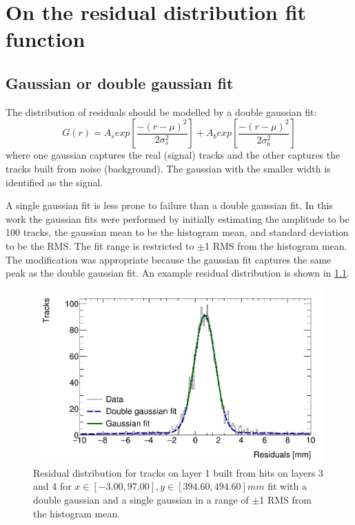 \chapter[Residual distribution fit function]{On the residual distribution fit function}
\label{appendix-double_gaussian}

\section{Gaussian or double gaussian fit}

The distribution of residuals should be modelled by a double gaussian fit:
$$ G(r) = A_{s}exp\left[ \frac{-(r-\mu)^{2}}{2\sigma_s^{2}} \right] + A_{b}exp\left[ \frac{-(r-\mu)^{2}}{2\sigma_b^{2}} \right]$$
where one gaussian captures the real (signal) tracks and the other captures the tracks built from noise (background). The gaussian with the smaller width is identified as the signal. 

A single gaussian fit is less prone to failure than a double gaussian fit. In this work the gaussian fits were performed by initially estimating the amplitude to be 100 tracks, the gaussian mean to be the histogram mean, and standard deviation to be the RMS. The fit range is restricted to $\pm$1 RMS from the histogram mean. The modification was appropriate because the gaussian fit captures the same peak as the double gaussian fit. An example residual distribution is shown in \ref{fig:double_gaussian_example_fit}. 

\begin{figure}
    \centering
    \includegraphics[width = \textwidth]{figures/figure_double_gaussian_quick_and_dirty_2900V_log_scale_gaussian_QL2C04_2900V_2021-02-08_2_xbin_10_ybin_5_100mm.png}
    \caption{Residual distribution for tracks on layer 1 built from hits on layers 3 and 4 for $x\in\left[-3.00, 97.00\right],  y\in\left[394.60, 494.60\right] mm$ fit with a double gaussian and a single gaussian in a range of $\pm$1 RMS from the histogram mean.}
    \label{fig:double_gaussian_example_fit}
\end{figure}

